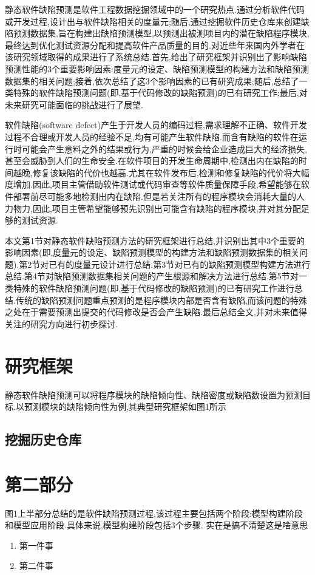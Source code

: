 \documentclass[UTF8]{rjthesis}
\begin{document}
	
	\rjmaketitle
	\begin{rjabstract}
		静态软件缺陷预测是软件工程数据挖掘领域中的一个研究热点.通过分析软件代码或开发过程,设计出与软件缺陷相关的度量元;随后,通过挖掘软件历史仓库来创建缺陷预测数据集,旨在构建出缺陷预测模型,以预测出被测项目内的潜在缺陷程序模块,最终达到优化测试资源分配和提高软件产品质量的目的.对近些年来国内外学者在该研究领域取得的成果进行了系统总结.首先,给出了研究框架并识别出了影响缺陷预测性能的3个重要影响因素:度量元的设定、缺陷预测模型的构建方法和缺陷预测数据集的相关问题;接着,依次总结了这3个影响因素的已有研究成果;随后,总结了一类特殊的软件缺陷预测问题(即,基于代码修改的缺陷预测)的已有研究工作;最后,对未来研究可能面临的挑战进行了展望.
	\end{rjabstract}
	
	软件缺陷(software defect)产生于开发人员的编码过程,需求理解不正确、软件开发过程不合理或开发人员的经验不足,均有可能产生软件缺陷.而含有缺陷的软件在运行时可能会产生意料之外的结果或行为,严重的时候会给企业造成巨大的经济损失,甚至会威胁到人们的生命安全.在软件项目的开发生命周期中,检测出内在缺陷的时间越晚,修复该缺陷的代价也越高.尤其在软件发布后,检测和修复缺陷的代价将大幅度增加.因此,项目主管借助软件测试或代码审查等软件质量保障手段,希望能够在软件部署前尽可能多地检测出内在缺陷.但是若关注所有的程序模块会消耗大量的人力物力,因此,项目主管希望能够预先识别出可能含有缺陷的程序模块,并对其分配足够的测试资源.

	本文第1节对静态软件缺陷预测方法的研究框架进行总结,并识别出其中3个重要的影响因素(即,度量元的设定、缺陷预测模型的构建方法和缺陷预测数据集的相关问题).第2节对已有的度量元设计进行总结.第3节对已有的缺陷预测模型构建方法进行总结.第4节对缺陷预测数据集相关问题的产生根源和解决方法进行总结.第5节对一类特殊的软件缺陷预测问题(即,基于代码修改的缺陷预测)的已有研究工作进行总结.传统的缺陷预测问题重点预测的是程序模块内部是否含有缺陷,而该问题的特殊之处在于需要预测出提交的代码修改是否会产生缺陷.最后总结全文,并对未来值得关注的研究方向进行初步探讨.
	
	\section{研究框架}
	静态软件缺陷预测可以将程序模块的缺陷倾向性、缺陷密度或缺陷数设置为预测目标.以预测模块的缺陷倾向性为例,其典型研究框架如图1所示
	\subsection{挖掘历史仓库}
	\section{第二部分}
	图1上半部分总结的是软件缺陷预测过程,该过程主要包括两个阶段:模型构建阶段和模型应用阶段.具体来说,模型构建阶段包括3个步骤.
实在是搞不清楚这是啥意思
	\begin{enumerate}
		\item 第一件事
		\item 第二件事
	\end{enumerate}
\end{document}
